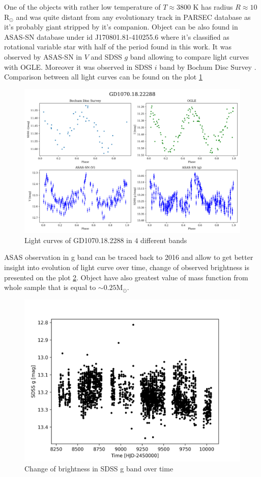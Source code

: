 \documentclass{pracalicmgr}
\begin{document}
One of the objects with rather low temperature of 
$T\approx 3800$ K has radius $R\approx 10$ $\textrm{R}_{\odot}$ and was quite distant from any evolutionary track in PARSEC database as it's probably giant stripped by 
it's companion. Object can be also found in ASAS-SN database \citep{jayasinghe_asas-sn_2019} under id J170801.81-410255.6 where it's classified as rotational variable star
with half of the period found in this work. It was observed by ASAS-SN in $V$ and SDSS $g$ band allowing to compare light curves with OGLE. Moreover 
it was observed in SDSS $i$ band by Bochum Disc Survey \citep{hackstein_bochum_2015}. Comparison between all light curves can be found on the plot \ref{comp}
\begin{figure}[H]
    \includegraphics[scale=0.5]{plots/GD1070.18.22288/lc_comparsion.png}
    \caption{Light curves of GD1070.18.2288 in $4$ different bands}\label{comp}
\end{figure}
ASAS observation in g band can be traced back to 2016 and allow to get better insight into evolution of light curve over time, change of observed brightness is presented on the
plot \ref{evolution}. Object have also greatest value of mass function from whole sample that is equal to $\sim 0.25 \textrm{M}_{\odot}$. 

\begin{figure}[H]
    \includegraphics{plots/GD1070.18.22288/visibility_over_time.png}
    \caption{Change of brightness in SDSS g band over time  }\label{evolution}
\end{figure}
\end{document}
